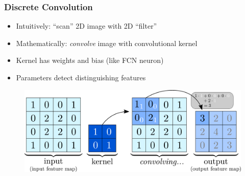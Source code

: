 \documentclass[14pt, t]{beamer}
\begin{document}
\begin{frame}
    \frametitle{Discrete Convolution}

    \begin{itemize}
    
        \item Intuitively: ``scan'' 2D image with 2D ``filter''

        \item Mathematically: \textit{convolve} image with convolutional kernel

        \item Kernel has weights and bias (like FCN neuron)

        \item Parameters detect distinguishing features

    \end{itemize}

    \begin{figure}[htb!]
        \centering
        \includegraphics[width=\linewidth]{vector/conv-single-channel.pdf}
    \end{figure}

\end{frame}
\end{document}
